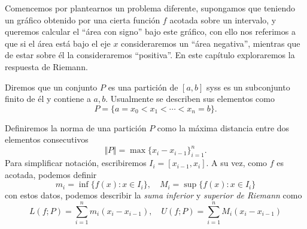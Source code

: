 \documentclass[11pt,oneside,a4paper]{book}
\begin{document}
Comencemos por plantearnos un problema diferente, supongamos que teniendo un gráfico obtenido por una cierta función $f$ acotada sobre un intervalo, y queremos calcular el ``área con signo'' bajo este gráfico, con ello nos referimos a que si el área está bajo el eje $x$ consideraremos un ``área negativa'', mientras que de estar sobre él la consideraremos ``positiva''. En este capítulo exploraremos la respuesta de Riemann.
\begin{mydef}[Partición]
Diremos que un conjunto $P$ es una partición de $[a,b]$ syss es un subconjunto finito de él y contiene a $a,b$. Usualmente se describen sus elementos como
$$P=\{a=x_0\lt x_1\lt\cdots\lt x_n=b\}.$$
\end{mydef}
Definiremos la norma de una partición $P$ como la máxima distancia entre dos elementos consecutivos
\begin{equation}
\Vert P\Vert=\max\{x_i-x_{i-1}\}_{i=1}^n.
\end{equation}
Para simplificar notación, escribiremos $I_i=[x_{i-1},x_i]$. A su vez, como $f$ es acotada, podemos definir
$$m_i=\inf\{f(x):x\in I_i\},\quad M_i=\sup\{f(x):x\in I_i\}$$
con estos datos, podemos describir la \textit{suma inferior} y \textit{superior de Riemann} como
$$L(f;P)=\sum_{i=1}^nm_i(x_i-x_{i-1}),\quad U(f;P)=\sum_{i=1}^nM_i(x_i-x_{i-1})$$
\begin{figure}
\centering
{}
\caption{}
\end{figure}
\end{document}
